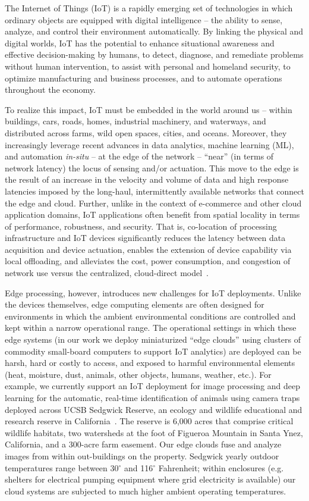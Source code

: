 The Internet of Things (IoT) is a rapidly emerging set of technologies in which ordinary objects are equipped with digital intelligence -- the ability to sense, analyze, and control their environment automatically. By linking the physical and digital worlds, IoT has the potential to enhance situational awareness and effective decision-making by humans, to detect, diagnose, and remediate problems without human intervention, to assist with personal and homeland security, to optimize manufacturing and business processes, and to automate operations throughout the economy.

To realize this impact, IoT must be embedded in the world around us -- within buildings, cars, roads, homes, industrial machinery, and waterways, and distributed across farms, wild open spaces, cities, and oceans. Moreover, they increasingly leverage recent advances in data analytics, machine learning (ML), and automation \textit{in-situ} -- at the edge of the network -- ``near'' (in terms of network latency) the locus of sensing and/or actuation. This move to the edge is the result of an increase in the velocity and volume of data and high response latencies imposed by the long-haul, intermittently available networks that connect the edge and cloud. Further, unlike in the context of e-commerce and other cloud application domains, IoT applications often benefit from spatial locality in terms of performance, robustness, and security. That is, co-location of processing infrastructure and IoT devices significantly reduces the latency between data acquisition and device actuation, enables the extension of device capability via local offloading, and alleviates the cost, power consumption, and congestion of network use versus the centralized, cloud-direct model~\cite{edge,bonomi2012fog,cloudlets2012satya,verbelen2012cloudlets}.

Edge processing, however, introduces new challenges for IoT deployments. Unlike the devices themselves, edge computing elements are often designed for environments in which the ambient environmental conditions are controlled and kept within a narrow operational range. The operational settings in which these edge systems (in our work we deploy miniaturized ``edge clouds'' using clusters of commodity small-board computers to support IoT analytics) are deployed can be harsh, hard or costly to access, and exposed to harmful environmental elements (heat, moisture, dust, animals, other objects, humans, weather, etc.). For example, we currently support an IoT deployment for image processing and deep learning for the automatic, real-time identification of animals using camera traps deployed across UCSB Sedgwick Reserve, an ecology and wildlife educational and research reserve in California~\cite{ref:sedgwick}. The reserve is 6,000 acres that comprise critical wildlife habitats, two watersheds at the foot of Figueroa Mountain in Santa Ynez, California, and a 300-acre farm easement. Our edge clouds fuse and analyze images from within out-buildings on the property. Sedgwick yearly outdoor temperatures range between 30$^{\circ}$ and 116$^{\circ}$ Fahrenheit; within enclosures (e.g. shelters for electrical pumping equipment where grid electricity is available) our cloud systems are subjected to much higher ambient operating temperatures.

